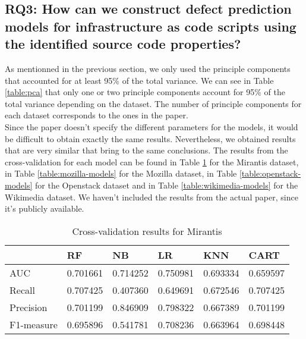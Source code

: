 \subsection{RQ3: How can we construct defect prediction models for 
infrastructure as code scripts using the identified source code properties?}
As mentionned in the previous section, we only used the principle components 
that accounted for at least 95\% of the total variance. We can see in Table
\ref{table:pca} that only one or two principle components account for 95\% of 
the total variance depending on the dataset. The number of principle components
for each dataset corresponds to the ones in the paper.\\

Since the paper doesn't specify the different parameters for the models, 
it would be difficult to obtain exactly the same results. Nevertheless, we 
obtained results that are very similar that bring to the same conclusions.
The results from the cross-validation for each model can be found in Table 
\ref{table:mirantis-models} for the Mirantis dataset, in Table \ref{table:mozilla-models}
for the Mozilla dataset, in Table \ref{table:openstack-models} for the Openstack
dataset and in Table \ref{table:wikimedia-models} for the Wikimedia dataset. 
We haven't included the results from the actual paper, since it's publicly 
available.



\begin{table}[h]
  \caption{Cross-validation results for Mirantis}
  \label{table:mirantis-models}
    \centering
    \begin{tabular}{|l|l|l|l|l|l|}
    \hline
        ~ & RF & NB & LR & KNN & CART \\ \hline
        AUC & 0.701661 & 0.714252 & 0.750981 & 0.693334 & 0.659597 \\ \hline
        Recall & 0.707425 & 0.407360 & 0.649691 & 0.672546 & 0.707425 \\ \hline
        Precision & 0.701199 & 0.846909 & 0.798322 & 0.667389 & 0.701199 \\ \hline
        F1-measure  & 0.695896 & 0.541781 & 0.708236 & 0.663964 & 0.698448 \\ \hline
    \end{tabular}
\end{table}

